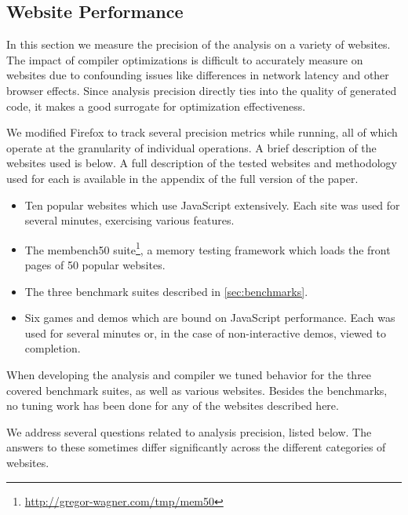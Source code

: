 \subsection{Website Performance}
\label{sec:websites}

In this section we measure the precision of the analysis
on a variety of websites.
The impact of compiler optimizations is difficult to accurately
measure on websites due to confounding issues like differences
in network latency and other browser effects.
Since analysis precision directly ties into the quality of
generated code, it makes a good surrogate for optimization effectiveness.

We modified Firefox to track several precision metrics while running,
all of which operate at the granularity of individual operations.
A brief description of the websites used is below.
A full description of the tested websites and methodology used for each
is available in the appendix of the full version of the paper.

\begin{itemize}

\item Ten popular websites which use JavaScript extensively.
Each site was used for several minutes, exercising various features.

\item The membench50 suite\footnote{\url{http://gregor-wagner.com/tmp/mem50}},
a memory testing framework
which loads the front pages of 50 popular websites.

\item The three benchmark suites described in \Section\ref{sec:benchmarks}.

\item Six games and demos which are bound on JavaScript performance.
Each was used for several minutes or, in the case of non-interactive
demos, viewed to completion.

\end{itemize}

When developing the analysis and compiler we tuned behavior for the three
covered benchmark suites, as well as various websites.
Besides the benchmarks, no tuning work has been done for any of the
websites described here.

We address several questions related to analysis precision,
listed below. The answers to these sometimes differ significantly
across the different categories of websites.

